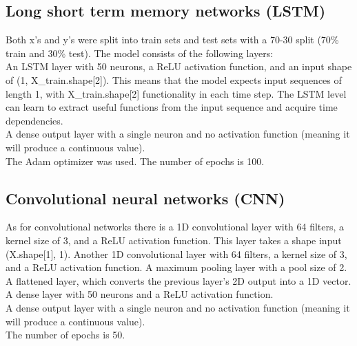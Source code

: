 \subsection{Long short term memory networks (LSTM)}
Both x's and y's were split into train sets and test sets with a 70-30 split (70\% train and 30\% test).
The model consists of the following layers:
\\An LSTM layer with 50 neurons, a ReLU activation function, and an input shape of (1, X\_train.shape[2]). This means that the model expects input sequences of length 1, with X\_train.shape[2] functionality in each time step. The LSTM level can learn to extract useful functions from the input sequence and acquire time dependencies.
\\A dense output layer with a single neuron and no activation function (meaning it will produce a continuous value).
\\The Adam optimizer was used. The number of epochs is 100.

\subsection{Convolutional neural networks (CNN)}
As for convolutional networks there is a 1D convolutional layer with 64 filters, a kernel size of 3, and a ReLU activation function. This layer takes a shape input (X.shape[1], 1).
Another 1D convolutional layer with 64 filters, a kernel size of 3, and a ReLU activation function.
A maximum pooling layer with a pool size of 2.
\\A flattened layer, which converts the previous layer's 2D output into a 1D vector.
A dense layer with 50 neurons and a ReLU activation function.
\\A dense output layer with a single neuron and no activation function (meaning it will produce a continuous value).
\\The number of epochs is 50.